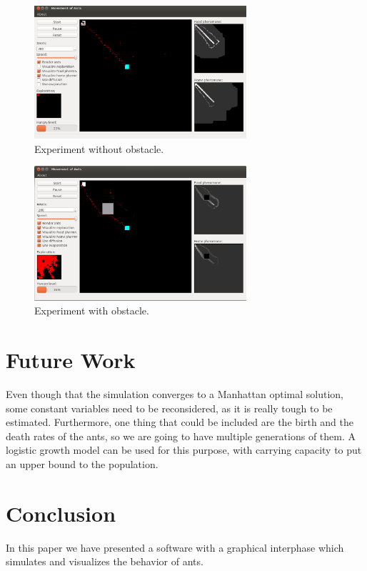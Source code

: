 \documentclass[paper=a4, fontsize=11pt]{scrartcl} %
\numberwithin{equation}{section} %
\numberwithin{figure}{section} %
\numberwithin{table}{section} %
\begin{document}
\begin{figure}[h!]
  \caption{Experiment without obstacle.}
  \label{fig2}
  \centering
    \includegraphics[width=0.7\textwidth]{noObstacle.png}
\end{figure}

\begin{figure}[h!]
  \caption{Experiment with obstacle.}
  \label{fig3}
  \centering
    \includegraphics[width=0.7\textwidth]{obstacle.png}
\end{figure}

\section{Future Work}
\label{future}
Even though that the simulation converges to a Manhattan optimal solution, some constant variables need to be reconsidered, as it is really tough to be estimated. Furthermore, one thing that could be included are the birth and the death rates of the ants, so we are going to have multiple generations of them. A logistic growth model can be used for this purpose, with carrying capacity to put an upper bound to the population.


\section{Conclusion}
\label{conclusion}
In this paper we have presented a software with a graphical interphase which simulates and visualizes the behavior of ants.
\end{document}
